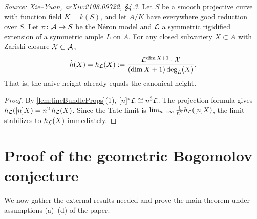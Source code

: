 \begin{lemma}
  \label{lem:canonicalHeightGoodReduction}
  \textit{Source: Xie--Yuan, arXiv:2108.09722, \S4.3.}
  Let \(S\) be a smooth projective curve with function field \(K=k(S)\), and let \(A/K\)
  have everywhere good reduction over \(S\).
  Let \(\pi\colon \mathcal{A} \to S\) be the N\'eron model and \(\mathcal{L}\) a symmetric rigidified
  extension of a symmetric ample \(L\) on \(A\).
  For any closed subvariety \(X \subset A\) with Zariski closure \(\mathcal{X} \subset \mathcal{A}\),
  \[
    \hat{h}(X) = h_{\mathcal{L}}(X)
    := \frac{\mathcal{L}^{\dim X+1} \cdot \mathcal{X}}{(\dim X+1)\deg_L(X)}.
  \]
  That is, the naive height already equals the canonical height.
\end{lemma}

\begin{proof}
  By \cref{lem:lineBundleProps}(1), \([n]^*\mathcal{L} \cong n^2\mathcal{L}\).
  The projection formula gives
  \(h_{\mathcal{L}}([n]X) = n^2\,h_{\mathcal{L}}(X)\).
  Since the Tate limit is \(\lim_{n\to\infty}\frac{1}{n^2}h_{\mathcal{L}}([n]X)\), the limit
  stabilizes to \(h_{\mathcal{L}}(X)\) immediately.
\end{proof}

\section{Proof of the geometric Bogomolov conjecture}
\label{sec:finalproof}

We now gather the external results needed and prove the main theorem under assumptions
(a)--(d) of the paper.

